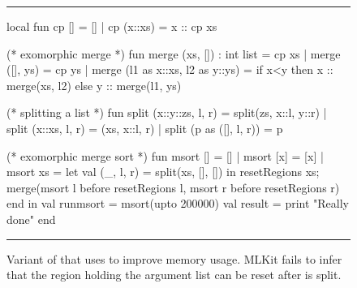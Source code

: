 \documentclass[12pt]{book}
\begin{document}
\begin{figure}
\hrule
\medskip
\begin{smlcode}
  local
    fun cp [] = []
      | cp (x::xs) = x :: cp xs

    (* exomorphic merge *)
    fun merge (xs, []) : int list = cp xs
      | merge ([], ys) = cp ys
      | merge (l1 as x::xs, l2 as y::ys) =
          if x<y then x :: merge(xs, l2)
          else y :: merge(l1, ys)

    (* splitting a list *)
    fun split (x::y::zs, l, r) = split(zs, x::l, y::r)
      | split (x::xs, l, r) = (xs, x::l, r)
      | split (p as ([], l, r)) = p

    (* exomorphic merge sort *)
    fun msort []  = []
      | msort [x] = [x]
      | msort xs = let val (_, l, r) = split(xs, [], [])
                   in resetRegions xs;
                      merge(msort l before resetRegions l,
                            msort r before resetRegions r)
                   end
  in
    val runmsort = msort(upto 200000)
    val result = print "Really done\n"
  end
\end{smlcode}
\caption{Variant of  that uses  to improve memory
  usage. MLKit fails to infer that the region holding the argument list
   can be reset after  is split.}
\label{msortreset1.fig}
\medskip \hrule
\end{figure}
\end{document}
